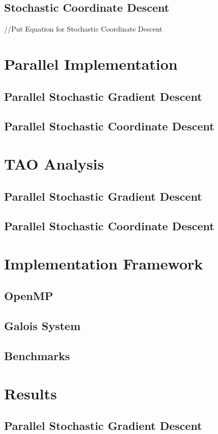 \documentclass{sigplanconf}
\begin{document}
\subsection{Stochastic Coordinate Descent}
//Put Equation for Stochastic Coordinate Descent

\section{Parallel Implementation}
\subsection{Parallel Stochastic Gradient Descent}
\subsection{Parallel Stochastic Coordinate Descent}

\section{TAO Analysis}
\subsection{Parallel Stochastic Gradient Descent}
\subsection{Parallel Stochastic Coordinate Descent}

\section{Implementation Framework}
\subsection{OpenMP}
\subsection{Galois System}
\subsection{Benchmarks}

\section{Results}
\subsection{Parallel Stochastic Gradient Descent}
\end{document}
